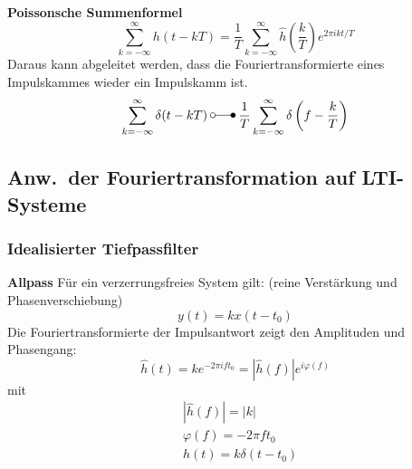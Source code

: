 \textbf{Poissonsche Summenformel}
\begin{equation*}
    \sum_{k=-\infty}^{\infty}h(t-kT)=\frac{1}{T}\sum_{k=-\infty}^{\infty}\hat{h}\left(\frac{k}{T}\right)e^{2\pi ikt/T}
\end{equation*}
Daraus kann abgeleitet werden, dass die Fouriertransformierte eines Impulskammes wieder ein Impulskamm ist.
\begin{equation*}
    \sum_{k=-\infty}^{\infty}\delta(t-kT) \: \laplace \: \frac{1}{T}\sum_{k=-\infty}^{\infty}\delta\left(f-\frac{k}{T}\right)
\end{equation*}

\subsection{Anw.\ der Fouriertransformation auf LTI-Systeme}

\subsubsection{Idealisierter Tiefpassfilter}
\textbf{Allpass}
Für ein verzerrungsfreies System gilt: (reine Verstärkung und Phasenverschiebung)
\begin{equation*}
    y(t) = kx(t-t_0)
\end{equation*}
Die Fouriertransformierte der Impulsantwort zeigt den Amplituden und Phasengang:
\begin{equation*}
    \hat{h}(t) = k e^{-2\pi ift_0} = |\hat{h}(f)|e^{i\varphi(f)}
\end{equation*}
mit
\begin{align*}
     & |\hat{h}(f)| = |k|            \\
     & \varphi(f)   = -2\pi ft_0     \\
     & h(t)         = k\delta(t-t_0)
\end{align*}

